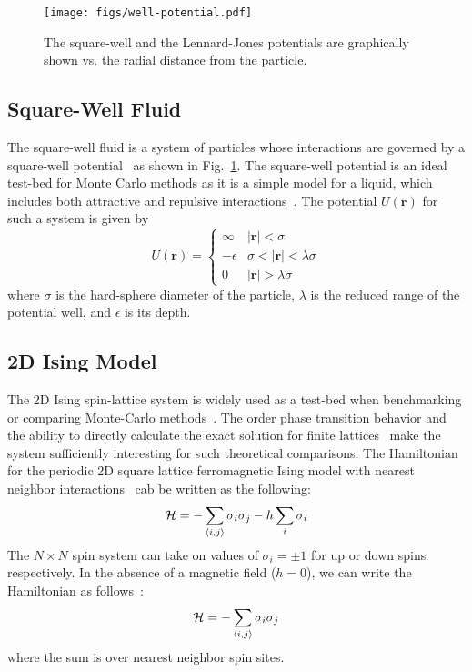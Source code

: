 \begin{figure}
    \centering
    \texttt{[image: figs/well-potential.pdf]}
    \caption{The square-well and the Lennard-Jones potentials are graphically shown vs. the radial distance from the particle.
    }
    \label{fig:well-potential}
  \end{figure}

\subsection{Square-Well Fluid}
The square-well fluid is a system of particles whose interactions are governed by a square-well
potential~\cite{singh2003surface, barker2004perturbationSW} as shown in Fig.~\ref{fig:well-potential}.  The square-well potential is an ideal test-bed
for Monte Carlo methods as it is a simple model for a liquid, which includes both attractive and repulsive
interactions~\cite{barker1967-SW-perturbation, vega1992phase}. The potential $U(\textbf{r})$ for such a system
is given by
\begin{equation}
 U(\textbf{r})=\begin{cases} \infty &
 \lvert\textbf{r}\rvert< \sigma\\-\epsilon &
 \sigma<\lvert\textbf{r}\rvert<\lambda\sigma\\0 &
 \lvert\textbf{r}\rvert > \lambda\sigma\end{cases}
\end{equation}
where $\sigma$ is the hard-sphere diameter of the particle, $\lambda$ is the reduced range of the potential well, and $\epsilon$ is its depth.

\subsection{2D Ising Model}
The 2D Ising spin-lattice system is widely used as a test-bed when benchmarking or comparing Monte-Carlo
methods~\cite{ferdinand1969bounded, wang1999transition, trebst2004optimizing}. The  order phase
transition behavior and the ability to directly calculate the exact solution for finite
lattices~\cite{beale1996exact} make the system sufficiently interesting for such theoretical comparisons.
The Hamiltonian for the periodic 2D square lattice ferromagnetic Ising model with nearest
neighbor interactions~\cite{landau2004new} cab be written as the following:
\begin{align}
\mathcal{H} = -\sum_{\braket{i,j}} \sigma_i \sigma_j - h \sum_i \sigma_i
\end{align}
The $N\times N$ spin system can take on values of $\sigma_i = \pm 1$
for up or down spins respectively. In the absence of a magnetic field ($h =
0$), we can write the Hamiltonian as follows~\cite{onsager1944crystal,
kaufman1949crystal}:
\begin{align}
\mathcal{H} = -\sum_{\braket{i,j}} \sigma_i \sigma_j
\end{align}
where the sum is over nearest neighbor spin sites.

